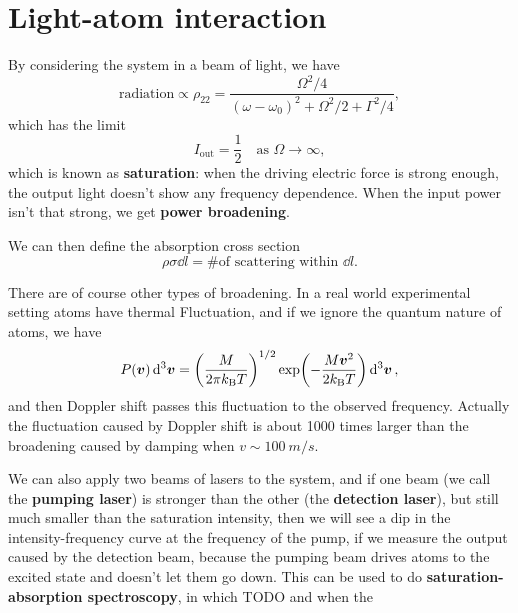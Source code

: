 \documentclass[hyperref, a4paper]{article}
\newcommand*{\concept}[1]{{\textbf{#1}}}
\newcommand{\kB}{k_{\text{B}}}
\begin{document}
\section{Light-atom interaction}

By considering the system in a beam of light, we have
\begin{equation}
    \text{radiation} \propto \rho_{22} = \frac{\Omega^2 / 4}{(\omega - \omega_0)^2 + \Omega^2 / 2 + \Gamma^2 / 4},
\end{equation}
which has the limit 
\begin{equation}
    I_{\text{out}} = \frac{1}{2} \quad \text{as $\Omega \to \infty$},
\end{equation} 
which is known as \concept{saturation}: 
when the driving electric force is strong enough, 
the output light doesn't show any frequency dependence. 
When the input power isn't that strong, 
we get \concept{power broadening}.

We can then define the absorption cross section 
\begin{equation}
    \rho \sigma \dd{l} = \text{\# of scattering within $\dd{l}$}.
\end{equation}

There are of course other types of broadening.
In a real world experimental setting 
atoms have thermal Fluctuation,
and if we ignore the quantum nature of atoms, 
we have 
\begin{equation}
    P(\vb*{v}) \dd[3]{\vb*{v}} = \left(\frac{M}{2 \pi \kB T}\right)^{1/2}
    \exp(- \frac{M \vb*{v}^2}{2 \kB T} ) \dd[3]{\vb*{v}},
\end{equation}
and then Doppler shift passes this fluctuation 
to the observed frequency.
Actually the fluctuation caused by Doppler shift 
is about 1000 times larger than the broadening caused by damping
when $v \sim \SI{100}{m/s}$.

We can also apply two beams of lasers to the system,
and if one beam (we call the \concept{pumping laser}) 
is stronger than the other (the \concept{detection laser}),
but still much smaller than the saturation intensity, 
then we will see a dip in the intensity-frequency curve 
at the frequency of the pump,
if we measure the output caused by the detection beam,
because the pumping beam drives
atoms to the excited state and doesn't let them go down.
This can be used to do
\concept{saturation-absorption spectroscopy},
in which TODO 
and when the 
\end{document}

